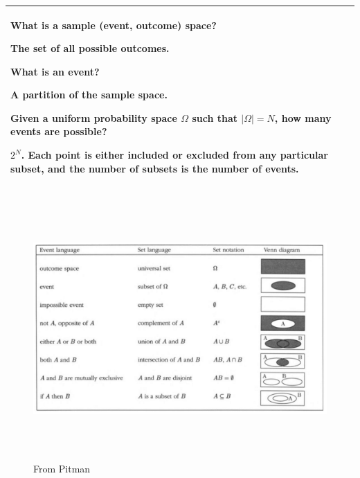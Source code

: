 {\tabulinesep=1mm
\begin{tabu}{|p{16cm} |}
\hline
\vspace{2 mm}
\begin{questions}
\item What is a sample (event, outcome) space?
\begin{solution}[1.5 cm]
The set of all possible outcomes.
\end{solution}

\item What is an event?
\begin{solution}[1.5 cm]
A partition of the sample space.
\end{solution}

\item Given a uniform probability space $\Omega$ such that 
$|\Omega| = N$, how many events are possible?
\begin{solution}[1.5 cm]
$2^N$. Each point is either included or excluded from any particular 
subset, and the number of subsets is the number of events.
\end{solution}

\end{questions}
\\
\hline
\end{tabu}
}

\begin{figure}[!ht]
\caption{From Pitman}
\includegraphics[width=17cm, height=10cm]{intro.jpg}
\end{figure}